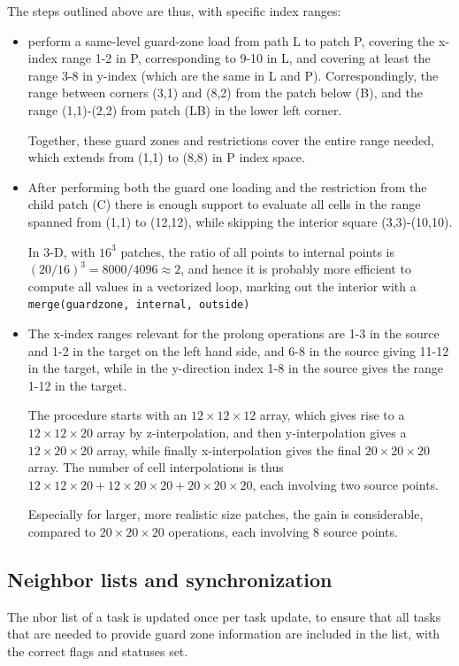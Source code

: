 \documentclass[paper=a4,fontsize=11pt]{scrartcl}
\numberwithin{equation}{section}		%
\numberwithin{figure}{section}			%
\numberwithin{table}{section}				%
\newcommand{\codecolor}{\color{Blue}}
\newcommand{\Code}[1]{{\codecolor\texttt{#1}}}
\begin{document}
The steps outlined above are thus, with specific index ranges:
\begin{itemize}
    \item perform a same-level guard-zone load from path L to patch P, covering the x-index range 1-2 in P, corresponding to 9-10 in L, and covering at least the range 3-8 in y-index (which are the same in L and P).  Correspondingly, the range between corners (3,1) and (8,2) from the patch below (B), and the range (1,1)-(2,2) from patch (LB) in the lower left corner.
    
    Together, these guard zones and restrictions cover the entire range needed, which extends from (1,1) to (8,8) in P index space.
    
    \item After performing both the guard one loading and the restriction from the child patch (C) there is enough support to evaluate all cells in the range spanned from (1,1) to (12,12), while skipping the interior square (3,3)-(10,10).
    
    In 3-D, with $16^3$ patches, the ratio of all points to internal points is $(20/16)^3 = 8000/4096 \approx 2$, and hence it is probably more efficient to compute all values in a vectorized loop, marking out the interior with a \Code{merge(guardzone, internal, outside)}

    \item The x-index ranges relevant for the prolong operations are 1-3 in the source and 1-2 in the target on the left hand side, and 6-8 in the source giving 11-12 in the target, while in the y-direction index 1-8 in the source gives the range 1-12 in the target.
    
    The procedure starts with an $12\times 12\times 12$ array, which gives rise to a $12\times 12\times 20$ array by z-interpolation, and then y-interpolation gives a $12\times 20\times 20$ array, while finally x-interpolation gives the final $20\times 20\times 20$ array.  The number of cell interpolations is thus $12\times 12\times 20 + 12\times 20\times 20 + 20\times 20\times 20$, each involving two source points.
    
    Especially for larger, more realistic size patches, the gain is considerable, compared to $20\times 20\times 20$ operations, each involving 8 source points.
\end{itemize}

\subsection{Neighbor lists and synchronization}
The nbor list of a task is updated once per task update, to ensure that all tasks that are needed to provide guard zone information are included in the list, with the correct flags and statuses set.
\end{document}
